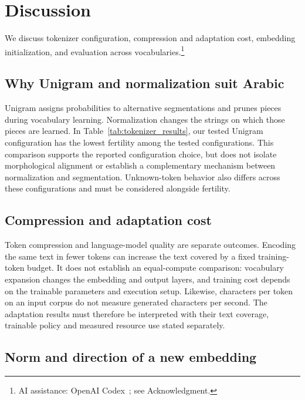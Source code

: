 \documentclass{ieeeaccess}
\begin{document}



\section{Discussion}
\label{sec:discussion}

We discuss tokenizer configuration, compression and adaptation cost,
embedding initialization, and evaluation across vocabularies.\footnote{AI assistance: OpenAI Codex~\cite{openaicodex2026}; see Acknowledgment.}

\subsection{Why Unigram and normalization suit Arabic}

Unigram assigns probabilities to alternative segmentations and prunes
pieces during vocabulary learning. Normalization changes the strings on
which those pieces are learned. In Table~\ref{tab:tokenizer_results},
our tested Unigram configuration has the lowest fertility among the tested configurations. This
comparison supports the reported configuration choice, but does not isolate
morphological alignment or establish a complementary mechanism between
normalization and segmentation. Unknown-token behavior also differs across
these configurations and must be considered alongside fertility.

\subsection{Compression and adaptation cost}

Token compression and language-model quality are separate outcomes.
Encoding the same text in fewer tokens can increase the text covered by a
fixed training-token budget. It does not establish an equal-compute
comparison: vocabulary expansion changes the embedding and output layers,
and training cost depends on the trainable parameters and execution setup.
Likewise, characters per token on an input corpus do not measure generated
characters per second. The adaptation results must therefore be interpreted
with their text coverage, trainable policy and measured resource use stated
separately.

\subsection{Norm and direction of a new embedding}
\end{document}
